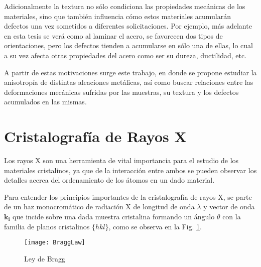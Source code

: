 Adicionalmente la textura no sólo condiciona las propiedades mecánicas de los materiales, sino que también influencia cómo estos materiales acumularán defectos una vez sometidos a diferentes solicitaciones. 
Por ejemplo, más adelante en esta tesis se verá como al laminar el acero, se favorecen dos tipos de orientaciones, pero los defectos tienden a acumularse en sólo una de ellas, lo cual a su vez afecta otras propiedades del acero como ser su dureza, ductilidad, etc.

A partir de estas motivaciones surge este trabajo, en donde se propone estudiar la anisotropía de distintas aleaciones metálicas, así como buscar relaciones entre las deformaciones mecánicas sufridas por las muestras, su textura y los defectos acumulados en las mismas.

\section{Cristalografía de Rayos X}\label{S:DRX}
Los rayos X son una herramienta de vital importancia para el estudio de los materiales cristalinos, ya que de la interacción entre ambos se pueden observar los detalles acerca del ordenamiento de los átomos en un dado material.

Para entender los principios importantes de la cristalografía de rayos X, se parte de un haz monocromático de radiación X de longitud de onda $\lambda$ y vector de onda $\mathbf{k_i}$ que incide sobre una dada muestra cristalina formando un ángulo $\theta$ con la familia de planos cristalinos $\{hkl\}$, como se observa en la Fig. \ref{fig:Bragg}.

\begin{figure}[htb!]
  \centering
  \texttt{[image: BraggLaw]}
  \caption{Ley de Bragg}
  \label{fig:Bragg}
\end{figure}

